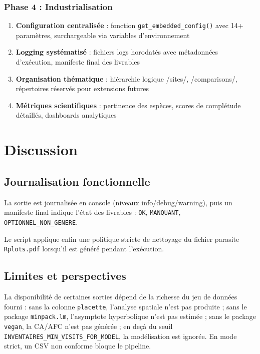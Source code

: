 \documentclass[11pt,a4paper]{article}
\begin{document}
\subsubsection{Phase 4 : Industrialisation}
\begin{enumerate}
  \item \textbf{Configuration centralisée} : fonction \texttt{get\_embedded\_config()} avec 14+ paramètres, surchargeable via variables d'environnement
  \item \textbf{Logging systématisé} : fichiers logs horodatés avec métadonnées d'exécution, manifeste final des livrables
  \item \textbf{Organisation thématique} : hiérarchie logique /sites/, /comparisons/, répertoires réservés pour extensions futures
  \item \textbf{Métriques scientifiques} : pertinence des espèces, scores de complétude détaillés, dashboards analytiques
\end{enumerate}

\section{Discussion}

\subsection{Journalisation fonctionnelle}
La sortie est journalisée en console (niveaux info/debug/warning), puis un manifeste final indique l'état des livrables :
\texttt{OK}, \texttt{MANQUANT}, \texttt{OPTIONNEL\_NON\_GENERE}.

Le script applique enfin une politique stricte de nettoyage du fichier parasite \texttt{Rplots.pdf} lorsqu'il est généré pendant l'exécution.

\subsection{Limites et perspectives}
La disponibilité de certaines sorties dépend de la richesse du jeu de données fourni : sans la
colonne \texttt{placette}, l'analyse spatiale n'est pas produite ; sans le package
\texttt{minpack.lm}, l'asymptote hyperbolique n'est pas estimée ; sans le package
\texttt{vegan}, la CA/AFC n'est pas générée ; en deçà du seuil
\texttt{INVENTAIRES\_MIN\_VISITS\_FOR\_MODEL}, la modélisation est ignorée. En mode strict, un
CSV non conforme bloque le pipeline.
\end{document}
